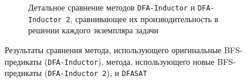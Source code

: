 \begin{figure}[ht]
\begin{subfigure}[b]{0.48\textwidth}
    \caption{Детальное сравнение методов \texttt{DFA-Inductor} и \texttt{DFA-Inductor~2}, сравнивающее их производительность в решении каждого экземпляра задачи}
    \label{img:plots:scatter}
  \end{subfigure}
  \caption{Результаты сравнения метода, использующего оригинальные BFS-предикаты (\texttt{DFA-Inductor}), метода, использующего новые BFS-предикаты (\texttt{DFA-Inductor~2}), и \texttt{DFASAT}}
  \label{img:plots}
\end{figure}




\chresults{\ref{sec:space}}

